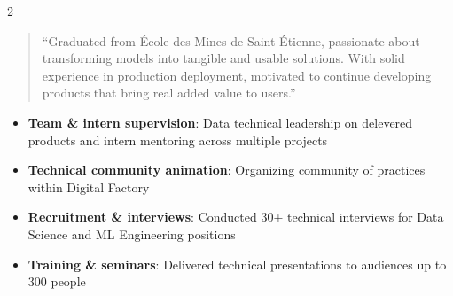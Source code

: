 \documentclass[10pt,a4paper,withhyper]{altacv}
\begin{document}
\begin{paracol}{2}
\nocite{*}

% 

\printbibliography[heading=pubtype,title={\printinfo{\faFile*[regular]}{Articles}},type=article]

% 

\switchcolumn


\begin{quote}
``Graduated from École des Mines de Saint-Étienne, passionate about transforming models into tangible and usable solutions. With solid experience in production deployment, motivated to continue developing products that bring real added value to users.''
\end{quote}



\divider


\divider


\divider


\medskip


\begin{itemize}
\item \textbf{Team \& intern supervision}: Data technical leadership on delevered products and intern mentoring across multiple projects
\item \textbf{Technical community animation}: Organizing community of practices within Digital Factory
\item \textbf{Recruitment \& interviews}: Conducted 30+ technical interviews for Data Science and ML Engineering positions
\item \textbf{Training \& seminars}: Delivered technical presentations to audiences up to 300 people
\end{itemize}



\end{paracol}
\end{document}
